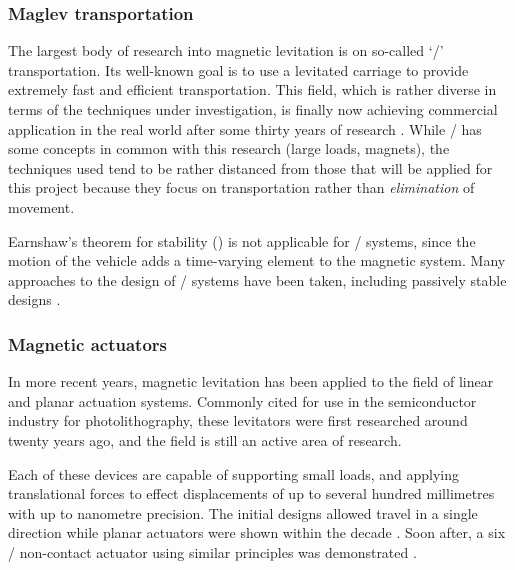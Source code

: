 \documentclass[11pt,a4paper]{memoir}
\begin{document}
\subsubsection{Maglev transportation}

The largest body of research into magnetic levitation is on so-called `\maglev/' transportation.
Its well-known goal is to use a levitated carriage to provide extremely fast and efficient transportation.
This field, which is rather diverse in terms of the techniques under investigation, is finally now achieving commercial application in the real world after some thirty years of research \parencite{lee2006-ietm}.
While \maglev/ has some concepts in common with this research (large loads, magnets), the techniques used tend to be rather distanced from those that will be applied for this project because they focus on transportation rather than \emph{elimination} of movement.

Earnshaw's theorem for stability () is not applicable for \maglev/ systems, since the motion of the vehicle adds a time-varying element to the magnetic system.
Many approaches to the design of \maglev/ systems have been taken, including passively stable designs \cite{musolino2009,hasirci2011-ieps}.


\subsubsection{Magnetic actuators}

In more recent years, magnetic levitation has been applied to the field of linear and planar actuation systems.
Commonly cited for use in the semiconductor industry for photolithography, these levitators were first researched around twenty years ago, and the field is still an active area of research.

Each of these devices are capable of supporting small loads, and applying translational forces to effect displacements of up to several hundred millimetres with up to nanometre precision.
The initial designs allowed travel in a single direction \parencite[\eg,][]{trumper1992} while planar actuators were shown within the decade \parencite[\eg,][]{kim1997-thesis,molenaar2000}.
Soon after, a six \dof/ non-contact actuator using similar principles was demonstrated \cite{verma2004}.
\end{document}

